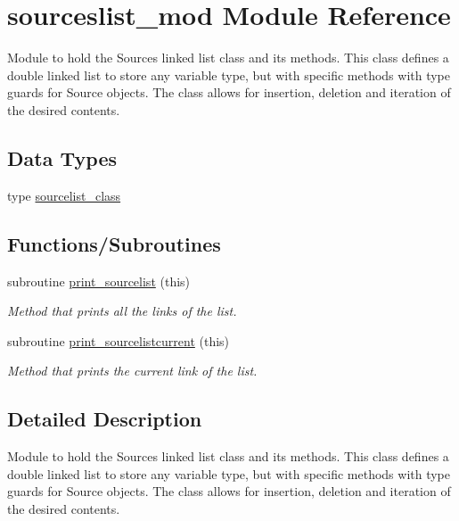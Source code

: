 \hypertarget{namespacesourceslist__mod}{}\section{sourceslist\+\_\+mod Module Reference}
\label{namespacesourceslist__mod}


Module to hold the Sources linked list class and its methods. This class defines a double linked list to store any variable type, but with specific methods with type guards for Source objects. The class allows for insertion, deletion and iteration of the desired contents.  


\subsection*{Data Types}
\begin{DoxyCompactItemize}
\item 
type \mbox{\hyperlink{structsourceslist__mod_1_1sourcelist__class}{sourcelist\+\_\+class}}
\end{DoxyCompactItemize}
\subsection*{Functions/\+Subroutines}
\begin{DoxyCompactItemize}
\item 
subroutine \mbox{\hyperlink{namespacesourceslist__mod_a1c359b48ae24045622cb6ec36a1bf6b2}{print\+\_\+sourcelist}} (this)
\begin{DoxyCompactList}\small\item\em Method that prints all the links of the list. \end{DoxyCompactList}\item 
subroutine \mbox{\hyperlink{namespacesourceslist__mod_a0d0f94845a8cd355e99e2e82d9ca3d35}{print\+\_\+sourcelistcurrent}} (this)
\begin{DoxyCompactList}\small\item\em Method that prints the current link of the list. \end{DoxyCompactList}\end{DoxyCompactItemize}


\subsection{Detailed Description}
Module to hold the Sources linked list class and its methods. This class defines a double linked list to store any variable type, but with specific methods with type guards for Source objects. The class allows for insertion, deletion and iteration of the desired contents. 


